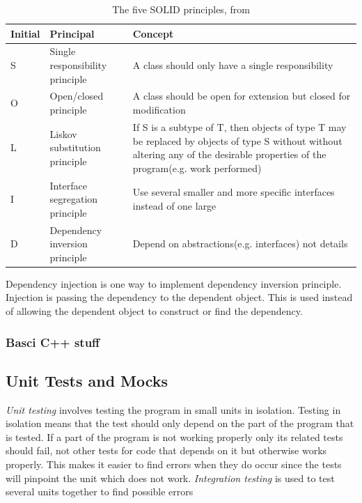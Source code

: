 \documentclass[10pt,a4paper]{report}
\begin{document}
\begin{table}[h]
\begin{tabular}{ l l p{2in}}
  \hline
  Initial & Principal & Concept\\
  \hline
  S & Single responsibility principle & A class should only have a single responsibility \\
  O & Open/closed principle & A class should be open for extension but closed for modification \\
  L & Liskov substitution principle & If S is a subtype of T, then objects of type T may be replaced by objects of type S without without altering any of the desirable properties of the program(e.g. work performed)\\
  I & Interface segregation principle & Use several smaller and more specific interfaces instead of one large \\
  D & Dependency inversion principle & Depend on abstractions(e.g. interfaces) not details \\
  \hline  
\end{tabular}
\caption{The five SOLID principles, from \cite{cleancode2008}}
\label{table:solid_table}
\end{table}

Dependency injection is one way to implement dependency inversion principle\cite{cleancode2008}. Injection is passing the dependency to the dependent object. This is used instead of allowing the dependent object to construct or find the dependency.

\subsubsection{Basci C++ stuff}

\subsection{Unit Tests and Mocks}
\emph{Unit testing} involves testing the program in small units in isolation. Testing in isolation means that the test should only depend on the part of the program that is tested. If a part of the program is not working properly only its related tests should fail, not other tests for code that depends on it but otherwise works properly. This makes it easier to find errors when they do occur since the tests will pinpoint the unit which does not work. \emph{Integration testing} is used to test several units together to find possible errors  
\end{document}
